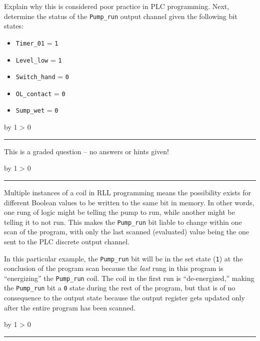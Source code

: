 \documentclass[12pt,a4paper]{article}
\def\oppgave{
            \advance\questnum by 1
            \ifnum \questnum > 0
                 \hrule
                 \vskip 3pt
                 \leftline{Oppgave \the\questnum}
                 \vskip 3pt \fi}
\def\svar{
           \advance\answnum by 1
           \ifnum \answnum > 0
                \hrule
                \vskip 3pt
                \leftline{Svar \the\answnum}
                \vskip 3pt \fi}
\def\notes{
           \advance\explnum by 1
           \ifnum \explnum > 0
                \hrule
                \vskip 3pt
                \leftline{Notes \the\explnum}
                \vskip 3pt \fi}
\begin{document}
Explain why this is considered poor practice in PLC programming.  Next, determine the status of the {\tt Pump\_run} output channel given the following bit states:

\begin{itemize}
\item{} {\tt Timer\_01} = {\tt 1}
\item{} {\tt Level\_low} = {\tt 1}
\item{} {\tt Switch\_hand} = {\tt 0}
\item{} {\tt OL\_contact} = {\tt 0}
\item{} {\tt Sump\_wet} = {\tt 0} 
\end{itemize}

\vfil

\eject
\vskip 10pt \filbreak 





\svar{} 

This is a graded question -- no answers or hints given!

\vskip 10pt \filbreak 





\notes{} 

Multiple instances of a coil in RLL programming means the possibility exists for different Boolean values to be written to the same bit in memory.  In other words, one rung of logic might be telling the pump to run, while another might be telling it to not run.  This makes the {\tt Pump\_run} bit liable to change within one scan of the program, with only the last scanned (evaluated) value being the one sent to the PLC discrete output channel.

\vskip 10pt

In this particular example, the {\tt Pump\_run} bit will be in the set state ({\tt 1}) at the conclusion of the program scan because the {\it last} rung in this program is ``energizing'' the {\tt Pump\_run} coil.  The coil in the first run is ``de-energized,'' making the {\tt Pump\_run} bit a {\tt 0} state during the rest of the program, but that is of no consequence to the output state because the output register gets updated only after the entire program has been scanned.


\vfil \eject 



\oppgave{} 
\end{document}
